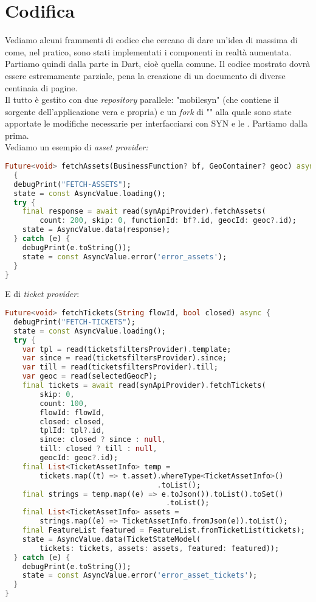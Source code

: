 \section{Codifica}
Vediamo alcuni frammenti di codice che cercano di dare un'idea di massima di come, nel pratico, sono stati implementati i componenti in realtà aumentata. Partiamo quindi dalla parte in Dart, cioè quella comune. Il codice mostrato dovrà essere estremamente parziale, pena la creazione di un documento di diverse centinaia di pagine.\\
Il tutto è gestito con due \textit{repository} parallele: "mobilesyn" (che contiene il sorgente dell'applicazione vera e propria) e un \textit{fork} di "\aplug{}" alla quale sono state apportate le modifiche necessarie per interfacciarsi con SYN e le \asa{}. Partiamo dalla prima.\\
Vediamo un esempio di \textit{asset provider:}

\begin{lstlisting}[language=dart, label={lst:mobilesyn_asset_provider},firstnumber=1,caption={mobilesyn \textit{asset provider}}]
Future<void> fetchAssets(BusinessFunction? bf, GeoContainer? geoc) async 
  {
  debugPrint("FETCH-ASSETS");
  state = const AsyncValue.loading();
  try {
    final response = await read(synApiProvider).fetchAssets(
        count: 200, skip: 0, functionId: bf?.id, geocId: geoc?.id);
    state = AsyncValue.data(response);
  } catch (e) {
    debugPrint(e.toString());
    state = const AsyncValue.error('error_assets');
  }
}
\end{lstlisting} 

E di \textit{ticket provider}:

\begin{lstlisting}[language=dart, label={lst:mobilesyn_ticket_provider}, firstnumber=1,caption={mobilesyn \textit{ticket provider}}]
Future<void> fetchTickets(String flowId, bool closed) async {
  debugPrint("FETCH-TICKETS");
  state = const AsyncValue.loading();
  try {
    var tpl = read(ticketsfiltersProvider).template;
    var since = read(ticketsfiltersProvider).since;
    var till = read(ticketsfiltersProvider).till;
    var geoc = read(selectedGeocP);
    final tickets = await read(synApiProvider).fetchTickets(
        skip: 0,
        count: 100,
        flowId: flowId,
        closed: closed,
        tplId: tpl?.id,
        since: closed ? since : null,
        till: closed ? till : null,
        geocId: geoc?.id);
    final List<TicketAssetInfo> temp =
        tickets.map((t) => t.asset).whereType<TicketAssetInfo>()
                                   .toList();
    final strings = temp.map((e) => e.toJson()).toList().toSet()
                                     .toList();
    final List<TicketAssetInfo> assets =
        strings.map((e) => TicketAssetInfo.fromJson(e)).toList();
    final FeatureList featured = FeatureList.fromTicketList(tickets);
    state = AsyncValue.data(TicketStateModel(
        tickets: tickets, assets: assets, featured: featured));
  } catch (e) {
    debugPrint(e.toString());
    state = const AsyncValue.error('error_asset_tickets');
  }
}
\end{lstlisting} 

